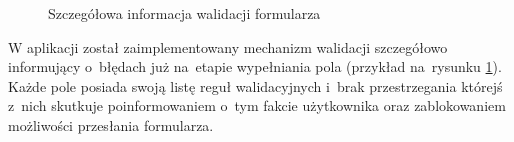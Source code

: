 \documentclass[12pt,a4paper,twoside,titlepage,openright]{book}
\begin{document}
\begin{figure}[h]
\begin{minipage}[t]{0.3\textwidth}
		\setlength{\fboxsep}{1pt}
		\caption{Szczegółowa informacja walidacji formularza}
		\label{fig:app-walidacja}
	\end{minipage}	
\end{figure}

W aplikacji został zaimplementowany mechanizm walidacji szczegółowo informujący o~błędach już na~etapie wypełniania pola (przykład na~rysunku \ref{fig:app-walidacja}). Każde pole posiada swoją listę reguł walidacyjnych i~brak przestrzegania którejś z~nich skutkuje poinformowaniem o~tym fakcie użytkownika oraz zablokowaniem możliwości przesłania formularza. 
\end{document}
